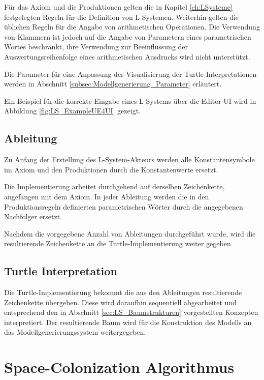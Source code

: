 Für das Axiom und die Produktionen gelten die in Kapitel \ref{ch:LSysteme} festgelegten Regeln für die Definition von L-Systemen. Weiterhin gelten die üblichen Regeln für die Angabe von arithmetischen Operationen. Die Verwendung von Klammern ist jedoch auf die Angabe von Parametern eines parametrischen Wortes beschränkt, ihre Verwendung zur Beeinflussung der Auswertungsreihenfolge eines arithmetischen Ausdrucks wird nicht unterstützt.

Die Parameter für eine Anpassung der Visualisierung der Turtle-Interpretationen werden in Abschnitt \ref{subsec:Modellgenerierung_Parameter} erläutert.

Ein Beispiel für die korrekte Eingabe eines L-Systems über die Editor-UI wird in Abbildung \ref{fig:LS_ExampleUE4UI} gezeigt.

\subsection{Ableitung}

Zu Anfang der Erstellung des L-System-Akteurs werden alle Konstantensymbole im Axiom und den Produktionen durch die Konstantenwerte ersetzt. 

Die Implementierung arbeitet durchgehend auf derselben Zeichenkette, angefangen mit dem Axiom. In jeder Ableitung werden die in den Produktionsregeln definierten parametrischen Wörter durch die angegebenen Nachfolger ersetzt.

Nachdem die vorgegebene Anzahl von Ableitungen durchgeführt wurde, wird die resultierende Zeichenkette an die Turtle-Implementierung weiter gegeben.

\subsection{Turtle Interpretation} \label{subsec:TurtleInterpretationImplementation}

Die Turtle-Implementierung bekommt die aus den Ableitungen resultierende Zeichenkette übergeben. Diese wird daraufhin sequentiell abgearbeitet und entsprechend den in Abschnitt \ref{sec:LS_Baumstrukturen} vorgestellten Konzepten interpretiert. Der resultierende Baum wird für die Konstruktion des Modells an das Modellgenerierungssystem weitergegeben.

\section{Space-Colonization Algorithmus}

